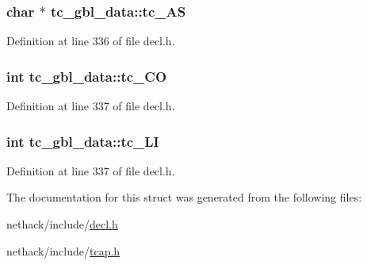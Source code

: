 \hypertarget{structtc__gbl__data_a0619ae5a4377f7b150b2eb97aedff5ce}{
\subsubsection[{tc\+\_\+\+A\+S}]{\setlength{\rightskip}{0pt plus 5cm}char $\ast$ tc\+\_\+gbl\+\_\+data\+::tc\+\_\+\+A\+S}}\label{structtc__gbl__data_a0619ae5a4377f7b150b2eb97aedff5ce}


Definition at line 336 of file decl.\+h.

\hypertarget{structtc__gbl__data_a012cd0f9f623dd5443002082796a37f7}{
\subsubsection[{tc\+\_\+\+C\+O}]{\setlength{\rightskip}{0pt plus 5cm}int tc\+\_\+gbl\+\_\+data\+::tc\+\_\+\+C\+O}}\label{structtc__gbl__data_a012cd0f9f623dd5443002082796a37f7}


Definition at line 337 of file decl.\+h.

\hypertarget{structtc__gbl__data_a7fd710d18e5b7cc4a90e627abc09fa03}{
\subsubsection[{tc\+\_\+\+L\+I}]{\setlength{\rightskip}{0pt plus 5cm}int tc\+\_\+gbl\+\_\+data\+::tc\+\_\+\+L\+I}}\label{structtc__gbl__data_a7fd710d18e5b7cc4a90e627abc09fa03}


Definition at line 337 of file decl.\+h.



The documentation for this struct was generated from the following files\+:\begin{DoxyCompactItemize}
\item 
nethack/include/\hyperlink{decl_8h}{decl.\+h}\item 
nethack/include/\hyperlink{tcap_8h}{tcap.\+h}\end{DoxyCompactItemize}
